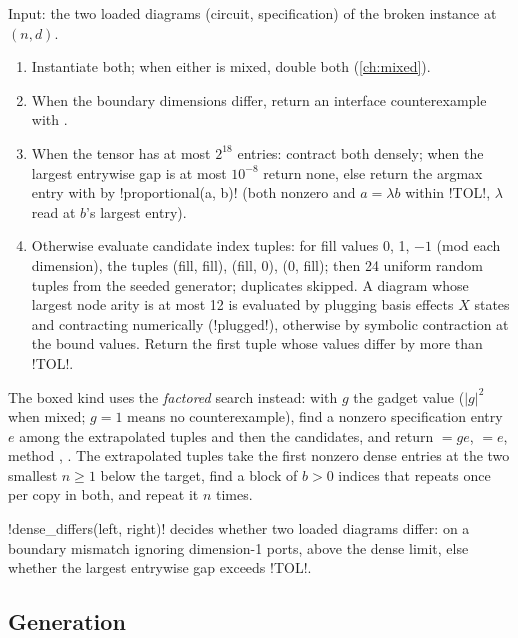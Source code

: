 \begin{algorithm}\label{alg:bench-differing}
Input: the two loaded diagrams (circuit, specification) of the broken instance at $(n,d)$.
\begin{enumerate}
\item Instantiate both; when either is mixed, double both (\cref{ch:mixed}).
\item When the boundary dimensions differ, return an interface counterexample
   with .
\item When the tensor has at most $2^{18}$ entries: contract both densely; when the largest
  entrywise gap is at most $10^{-8}$ return none, else return the argmax entry with
   by \py!proportional(a, b)! (both nonzero and $a = \lambda b$ within
  \py!TOL!, $\lambda$ read at $b$'s largest entry).
\item Otherwise evaluate candidate index tuples: for fill values 0, 1, $-1$ (mod each
  dimension), the tuples (fill, fill), (fill, 0), (0, fill); then 24 uniform random tuples from
  the seeded generator; duplicates skipped. A diagram whose largest node arity is at most 12 is
  evaluated by plugging basis effects $X$ states and contracting numerically (\py!plugged!),
  otherwise by symbolic contraction at the bound values. Return the first tuple whose values
  differ by more than \py!TOL!.
\end{enumerate}
\end{algorithm}

The boxed  kind uses the \emph{factored} search instead: with $g$ the gadget
value ($|g|^2$ when mixed; $g=1$ means no counterexample), find a nonzero specification entry $e$
among the extrapolated tuples and then the candidates, and return  $=ge$,
 $=e$, method , . The extrapolated tuples
take the first nonzero dense entries at the two smallest $n\ge1$ below the target, find a block
of $b>0$ indices that repeats once per copy in both, and repeat it $n$ times.

\py!dense_differs(left, right)! decides whether two loaded diagrams differ:  on a
boundary mismatch ignoring dimension-1 ports,  above the dense limit, else whether the
largest entrywise gap exceeds \py!TOL!.

\subsection{Generation}

